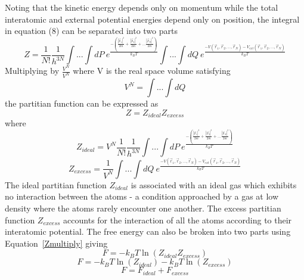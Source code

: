 \documentclass[double,12pt]{beavtex}
\begin{document}
Noting that the kinetic energy depends only on momentum while the total interatomic and external potential energies depend only on position, the integral in equation (8) can be separated into two parts 
\begin{equation}{Z=\frac{1}{N!}\frac{1}{h^{3N}}\int...\int{dP}~e^\frac{-(\frac{|\vec{p}_1|^2}{2m}+\frac{|\vec{p}_2|^2}{2m}+...\frac{|\vec{p}_N|^2}{2m})}{k_BT}\int...\int{dQ}~e^\frac{-V(\vec{r}_1,\vec{r}_2,{...},\vec{r}_N)-V_{ext}(\vec{r}_1,\vec{r}_2,{...},\vec{r}_N)}{k_BT}}\end{equation}  Multiplying by $\frac{V^N}{V^N}$ where V is the real space volume satisfying \begin{equation}{V^N=}\int{...}\int{dQ}\end{equation} 
the partitian function can be expressed as
\begin{equation}\label{Zmultiply}{Z=Z_{ideal}Z_{excess}}\end{equation}
where
\begin{equation}{Z_{ideal}=V^N\frac{1}{N!}\frac{1}{h^{3N}}\int{...}\int{dP}~e^\frac{-(\frac{|\vec{p}_1|^2}{2m}+ \frac{|\vec{p}_2|^2}{2m}+...\frac{|\vec{p}_N|^2}{2m})}{k_BT}}\end{equation}
\begin{equation}{Z_{excess}=\frac{1}{V^N}\int{...}\int{dQ}~e^\frac{-V(\vec{r}_1,\vec{r}_2,{...},\vec{r}_N)-V_{ext}(\vec{r}_1,\vec{r}_2,{...},\vec{r}_N )}{k_BT}}\end{equation} The ideal partitian function $Z_{ideal}$ is associated with an ideal gas which exhibits no interaction between the atoms - a condition approached by a gas at low density where the atoms rarely encounter one another. The excess partitian function $Z_{excess}$ accounts for the interaction of all the atoms according to their interatomic potential. The free energy can also be broken into two parts using Equation~\ref{Zmultiply} giving
\begin{equation}{F=-k_{B}T\ln(Z_{ideal}Z_{excess})}\end{equation}
\begin{equation}{F=-k_{B}T\ln(Z_{ideal})-k_{B}T\ln(Z_{excess})}\end{equation}
\begin{equation}{F=F_{ideal} + F_{excess}}\end{equation} 
\end{document}
